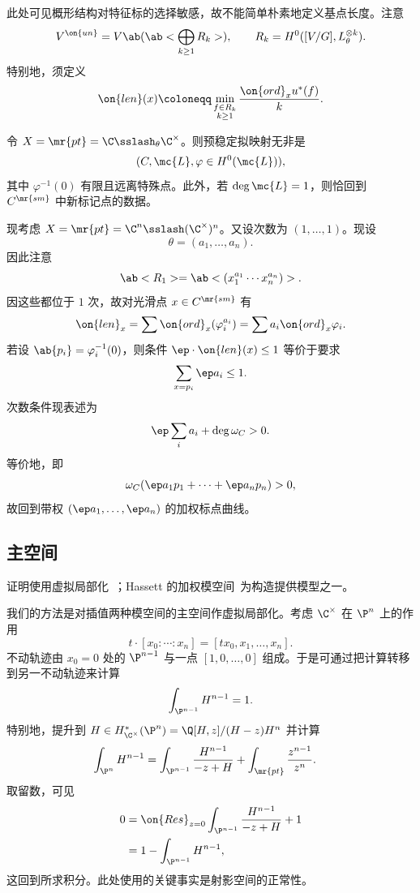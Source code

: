 此处可见概形结构对特征标的选择敏感，故不能简单朴素地定义基点长度。注意
\[ V^{\on{un}} = V\ab(\ab< \bigoplus_{k \geq 1} R_k>), \qquad R_k = H^0([V/G], L_{\theta}^{\otimes k}). \]
特别地，须定义
\[ \on{len}(x) \coloneqq \min_{\substack{f \in R_k \\ k \geq 1}} \frac{\on{ord}_x u^*(f)}{k}. \]

\begin{exm}
    令 \(X = \mr{pt} = \C \sslash_{\theta} \C^{\times}\)。则预稳定拟映射无非是
    \[ (C, \mc{L}, \varphi \in H^0(\mc{L})), \]
    其中 \(\varphi^{-1}(0)\) 有限且远离特殊点。此外，若 \(\deg \mc{L} = 1\)，则恰回到 \(C^{\mr{sm}}\) 中新标记点的数据。
\end{exm}

\begin{exm}
    现考虑 \(X = \mr{pt} = \C^n \sslash (\C^{\times})^n\)。又设次数为 \((1, \ldots, 1)\)。现设
    \[ \theta = (a_1, \ldots, a_n). \]
    因此注意
    \[ \ab<R_1> = \ab<(x_1^{a_1} \cdots x_n^{a_n})>. \]
    因这些都位于 \(1\) 次，故对光滑点 \(x \in C^{\mr{sm}}\) 有
    \[ \on{len}_x = \sum \on{ord}_x (\varphi_i^{a_i}) = \sum a_i \on{ord}_x \varphi_i. \]
    若设 \(\ab\{p_i\} = \varphi_i^{-1}(0)\)，则条件 \(\ep \cdot \on{len}(x) \leq 1\) 等价于要求
    \[ \sum_{x = p_i} \ep a_i \leq 1. \]
    次数条件现表述为
    \[ \ep \sum_i a_i + \deg \omega_C > 0. \]
    等价地，即
    \[ \omega_C(\ep a_1 p_1 + \cdots + \ep a_n p_n) > 0, \]
    故回到带权 \((\ep a_1, \ldots, \ep a_n)\) 的加权标点曲线。
\end{exm}

\subsection{主空间}%
\label{sub:Master space}

证明使用虚拟局部化~\cite{GP1999}；Hassett 的加权模空间~\cite{Hassett2003}为构造提供模型之一。

我们的方法是对插值两种模空间的主空间作虚拟局部化。考虑 \(\C^{\times}\) 在 \(\P^n\) 上的作用
\[ t \cdot [x_0 : \cdots : x_n] = [t x_0, x_1, \ldots, x_n]. \]
不动轨迹由 \(x_0 = 0\) 处的 \(\P^{n-1}\) 与一点 \([1, 0, \ldots, 0]\) 组成。于是可通过把计算转移到另一不动轨迹来计算
\[ \int_{\P^{n-1}} H^{n-1} = 1. \]
特别地，提升到 \(H \in H_{\C^{\times}}^* (\P^n) = \Q[H,z] / (H-z)H^n\) 并计算
\begin{align*}
    \int_{\P^n} H^{n-1} &= \int_{\P^{n-1}} \frac{H^{n-1}}{-z+H} + \int_{\mr{pt}} \frac{z^{n-1}}{z^n}.
\end{align*}
取留数，可见
\begin{align*}
    0 &= \on{Res}_{z = 0}\int_{\P^{n-1}} \frac{H^{n-1}}{-z+H} + 1 \\
    &= 1 - \int_{\P^{n-1}}H^{n-1},
\end{align*}
这回到所求积分。此处使用的关键事实是射影空间的正常性。

